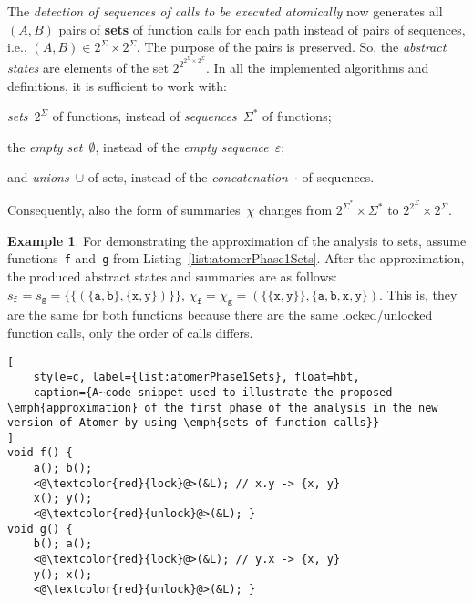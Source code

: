 \documentclass{ExcelAtFIT}
\theoremstyle{definition}
\newtheorem{example}{Example}[section]
\begin{document}
The \emph{detection of sequences of calls to be executed atomically} now generates all ${ (A, B) }$ pairs of \textbf{sets} of function calls for each path instead of pairs of sequences, i.e., $ {(A, B)} \in 2^\Sigma \times 2^\Sigma $. The purpose of the pairs is preserved. So, the \emph{abstract states} are elements of the set $ 2^{2^{2^\Sigma \times 2^\Sigma}} $. In all the implemented algorithms and definitions, it is sufficient to work with:
\begin{enuminline}
    \item \emph{sets}~$ 2^\Sigma $ of functions, instead of \emph{sequences}~$ \Sigma^* $ of functions;

    \item the \emph{empty set}~$ \emptyset $, instead of the \emph{empty sequence}~$ \varepsilon $;
    
    \item and \emph{unions}~$ \cup $ of sets, instead of the \emph{concatenation}~$ \cdot $ of sequences.
\end{enuminline}
Consequently, also the form of summaries~$ \chi $ changes from $ 2^{\Sigma^*} \times \Sigma^* $ to $ 2^{2^\Sigma} \times 2^\Sigma $.

\begin{example}
    For demonstrating the approximation of the analysis to sets, assume functions~\texttt{f} and~\texttt{g} from Listing~\ref{list:atomerPhase1Sets}. After the approximation, the produced abstract states and summaries are as follows: $ s_\mathtt{f} = s_\mathtt{g} = \{\{({\{\mathtt{a}, \mathtt{b}\}}, {\{\mathtt{x}, \mathtt{y}\}})\}\} $, $ \chi_\mathtt{f} = \chi_\mathtt{g} = ({\{\{\mathtt{x}, \mathtt{y}\}\}}, \{\mathtt{a}, \mathtt{b}, \allowbreak \mathtt{x}, \mathtt{y}\}) $. This is, they are the same for both functions because there are the same locked/unlocked function calls, only the order of calls differs.
\end{example}

\begin{lstlisting}[
    style=c, label={list:atomerPhase1Sets}, float=hbt,
    caption={A~code snippet used to illustrate the proposed \emph{approximation} of the first phase of the analysis in the new version of Atomer by using \emph{sets of function calls}}
]
void f() {
    a(); b();
    <@\textcolor{red}{lock}@>(&L); // x.y -> {x, y}
    x(); y();
    <@\textcolor{red}{unlock}@>(&L); }
void g() {
    b(); a();
    <@\textcolor{red}{lock}@>(&L); // y.x -> {x, y}
    y(); x();
    <@\textcolor{red}{unlock}@>(&L); }
\end{lstlisting}
\end{document}
